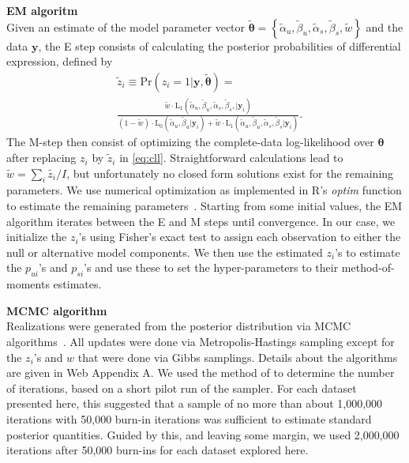 \documentclass[useAMS,referee,usenatbib]{biom}
\begin{document}
\noindent\textbf{EM algoritm}\\
Given an estimate of the model parameter vector $\tilde{\boldsymbol{\theta}}=\left\{\tilde{\alpha}_u,\tilde{\beta}_u,\tilde{\alpha}_s,\tilde{\beta}_s,\tilde{w}\right\}$ and the data $\mathbf{y}$, the E step consists of calculating the posterior probabilities of differential expression, defined by
\[
\begin{split}
&\tilde z_{i} \equiv \mathrm{Pr}(z_i=1|\mathbf{y},\tilde{\boldsymbol{\theta}})=\\ &\frac{\tilde{w} \cdot \mathrm{L}_1(\tilde{\alpha}_u,\tilde{\beta}_u,\tilde{\alpha}_s,\tilde{\beta}_s,|\mathbf{y}_i)}{(1-\tilde{w})\cdot\mathrm{L}_0(\tilde{\alpha}_u,\tilde{\beta}_u|\mathbf{y}_i)+\tilde{w}\cdot\mathrm{L}_1(\tilde{\alpha}_u,\tilde{\beta}_u,\tilde{\alpha}_s,\tilde{\beta}_s|\mathbf{y}_i)}.
\end{split}
\] 
The M-step then consist of optimizing the complete-data log-likelihood over $\boldsymbol{\theta}$ after replacing $z_i$ by $\tilde{z}_{i}$ in \eqref{eq:cll}. Straightforward calculations lead to 
$\tilde w = \sum_i{\tilde{z_i}}/I$, but unfortunately no closed form solutions exist for the remaining parameters. We use numerical optimization as implemented in R's \textit{optim} function to estimate the remaining parameters~\citep{Ihaka:1996ud}.  Starting from some initial values, the EM algorithm iterates between the E and M steps until convergence. In our case, we initialize the $z_{i}$'s using Fisher's exact test to assign each observation to either the null or alternative model components. We then use the estimated $z_i$'s to estimate the $p_{ui}$'s and $p_{si}$'s and use these to set the hyper-parameters to their method-of-moments estimates.

\noindent\textbf{MCMC algorithm}\\
Realizations were generated from the posterior distribution via MCMC algorithms~\citep{Gelfand:1996wc}. All updates were done via Metropolis-Hastings sampling except for the $z_i$'s and $w$ that were done via Gibbs samplings.
Details about the algorithms are given in Web Appendix A. We used the method of \cite{Raftery:1992vp,Raftery:1996ws} to determine the number of iterations, based on a short pilot run of the sampler. For each dataset presented here, this suggested that a sample of no more than about 1,000,000 iterations with 50,000 burn-in iterations was sufficient to estimate standard posterior quantities. Guided by this, and leaving some margin, we used 2,000,000 iterations after 50,000  burn-ins for each dataset explored here. 
\end{document}
